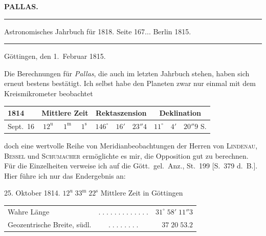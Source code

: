 \clearpage{}\hypertarget{native-388-lower}{}\label{native-388-lower}
\begin{center}\textbf{PALLAS.}\par\vspace{4pt}\hrule\vspace{4pt}\fontsize{10}{12}\selectfont Astronomisches Jahrbuch für 1818. Seite 167\;... Berlin 1815.\par\vspace{4pt}\hrule\vspace{4pt}\end{center}

\begin{flushright}
Göttingen, den 1.\ Februar 1815.
\end{flushright}

\par\indent Die Berechnungen für \emph{Pallas}, die auch im letzten Jahrbuch stehen, haben sich erneut bestens bestätigt. Ich selbst habe den Planeten zwar nur einmal mit dem Kreismikrometer beobachtet

\begin{center}
\fontsize{9}{11}\selectfont\setlength{\tabcolsep}{3pt}\renewcommand{\arraystretch}{1.15}\begin{tabular}{l|ccc|ccc|ccc}
1814 & \multicolumn{3}{c|}{Mittlere Zeit} & \multicolumn{3}{c|}{Rektaszension} & \multicolumn{3}{c}{Deklination} \\
\hline
Sept.\ 16 & $12^{\mathrm u}$ & $1^{\mathrm m}$ & $1^{\mathrm s}$ & $146^\circ$ & $16'$ & $23''4$ & $11^\circ$ & $4'$ & $20''9$ S. \\
\end{tabular}
\end{center}

\noindent doch eine wertvolle Reihe von Meridianbeobachtungen der Herren von \textsc{Lindenau}, \textsc{Bessel} und \textsc{Schumacher} ermöglichte es mir, die Opposition gut zu berechnen. Für die Einzelheiten verweise ich auf die Gött.\ gel.\ Anz., St.\ 199 [S.\ 379 d.\ B.]. Hier führe ich nur das Endergebnis an:

\begin{center}25. Oktober 1814. $12^{\mathrm u}\;33^{\mathrm m}\;22^{\mathrm s}$ Mittlere Zeit in Göttingen\end{center}
\begin{center}\fontsize{10}{12}\selectfont\setlength{\tabcolsep}{3pt}\renewcommand{\arraystretch}{1.15}\begin{tabular}{lcr}
Wahre Länge & $.\;.\;.\;.\;.\;.\;.\;.\;.\;.\;.\;.\;.$ & $31^\circ\;58'\;11''3$\\
Geozentrische Breite, südl. & $.\;.\;.\;.\;.\;.\;.\;.$ & $37\;20\;53.2$\\
\end{tabular}\end{center}

